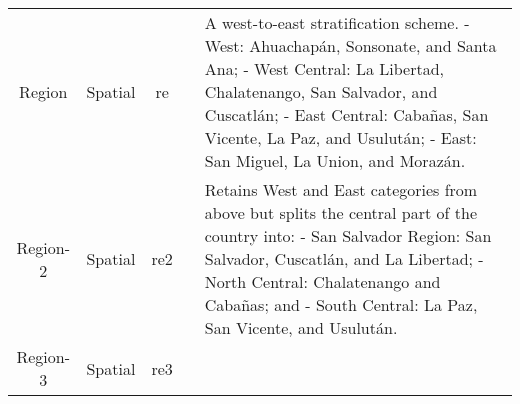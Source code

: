 \documentclass[11pt,]{article}
\begin{document}
\begin{longtable}[]{@{}ccccl@{}}
\begin{minipage}[t]{0.17\columnwidth}\centering
Region\strut
\end{minipage} & \begin{minipage}[t]{0.14\columnwidth}\centering
Spatial\strut
\end{minipage} & \begin{minipage}[t]{0.08\columnwidth}\centering
re\strut
\end{minipage} & \begin{minipage}[t]{0.09\columnwidth}\centering
4\strut
\end{minipage} & \begin{minipage}[t]{0.38\columnwidth}\raggedright
A west-to-east stratification scheme. - West: Ahuachapán, Sonsonate, and
Santa Ana; - West Central: La Libertad, Chalatenango, San Salvador, and
Cuscatlán; - East Central: Cabañas, San Vicente, La Paz, and Usulután; -
East: San Miguel, La Union, and Morazán.\strut
\end{minipage}\tabularnewline
\begin{minipage}[t]{0.17\columnwidth}\centering
Region-2\strut
\end{minipage} & \begin{minipage}[t]{0.14\columnwidth}\centering
Spatial\strut
\end{minipage} & \begin{minipage}[t]{0.08\columnwidth}\centering
re2\strut
\end{minipage} & \begin{minipage}[t]{0.09\columnwidth}\centering
5\strut
\end{minipage} & \begin{minipage}[t]{0.38\columnwidth}\raggedright
Retains West and East categories from above but splits the central part
of the country into: - San Salvador Region: San Salvador, Cuscatlán, and
La Libertad; - North Central: Chalatenango and Cabañas; and - South
Central: La Paz, San Vicente, and Usulután.\strut
\end{minipage}\tabularnewline
\begin{minipage}[t]{0.17\columnwidth}\centering
Region-3\strut
\end{minipage} & \begin{minipage}[t]{0.14\columnwidth}\centering
Spatial\strut
\end{minipage} & \begin{minipage}[t]{0.08\columnwidth}\centering
re3\strut
\end{minipage} & \begin{minipage}[t]{0.09\columnwidth}\centering

\end{minipage}
\end{longtable}
\end{document}
